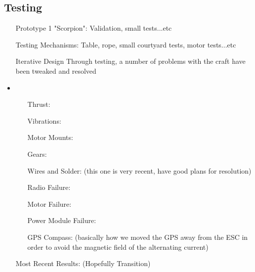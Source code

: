 \subsection{Testing}
\begin{itemize}
\item[Prototype 1 "Scorpion":] Validation, small tests...etc
\item[Testing Mechanisms:] Table, rope, small courtyard tests, motor tests...etc
\item[Iterative Design] Through testing, a number of problems with the craft have been tweaked and resolved
\item\begin{itemize}
		\item[Thrust:]
		\item[Vibrations:]
		\item[Motor Mounts:]
		\item[Gears:]
		\item[Wires and Solder:] (this one is very recent, have good plans for resolution)
		\item[Radio Failure:]
		\item[Motor Failure:]
		\item[Power Module Failure:]
		\item[GPS Compass:] (basically how we moved the GPS away from the ESC in order to avoid the magnetic field of the alternating current)
		
\end{itemize}
\item[Most Recent Results:] (Hopefully Transition)
\end{itemize}

